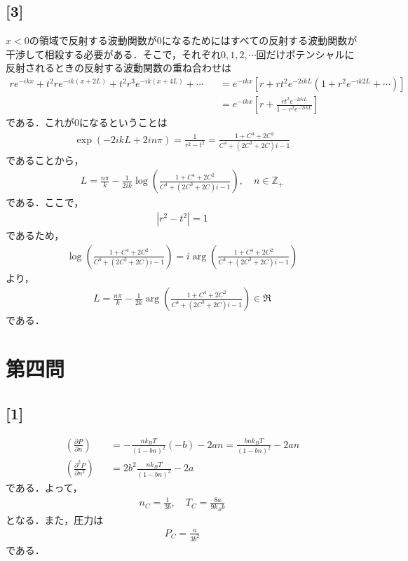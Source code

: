 \documentclass[12pt,dvipdfmx]{jsarticle}
\begin{document}
\subsection*{\large{[3]}}
$x<0$の領域で反射する波動関数が$0$になるためにはすべての反射する波動関数が干渉して相殺する必要がある．そこで，それぞれ$0,1,2,\cdots$回だけポテンシャルに反射されるときの反射する波動関数の重ね合わせは
\begin{eqnarray}
  re^{-ikx} + t^2re^{-ik(x+2L)} + t^2r^3e^{-ik(x+4L)} + \cdots &&= e^{-ikx}\left[ r+ rt^2 e^{-2ikL}\left( 1 + r^2 e^{-ik2L} + \cdots \right) \right]\\
  &&=e^{-ikx}\left[ r+\frac{rt^2e^{-2ikL}}{1-r^2e^{-2ikL}} \right]
\end{eqnarray}
である．これが$0$になるということは
\begin{eqnarray}
  \exp\left( -2ikL+2in\pi \right) = \frac{1}{r^2-t^2} = \frac{1+C^4+2C^2}{C^4+(2C^3+2C)i-1}
\end{eqnarray}
であることから，
\begin{eqnarray}
  L = \frac{n\pi}{k} -\frac{1}{2ik}\log\left( \frac{1+C^4+2C^2}{C^4+(2C^3+2C)i-1} \right), \quad n\in\mathbb{Z}_+
\end{eqnarray}
である．ここで，
\begin{eqnarray}
  |r^2-t^2|=1
\end{eqnarray}
であるため，
\begin{eqnarray}
  \log\left( \frac{1+C^4+2C^2}{C^4+(2C^3+2C)i-1} \right) = i\arg \left( \frac{1+C^4+2C^2}{C^4+(2C^3+2C)i-1} \right) 
\end{eqnarray}
より，
\begin{eqnarray}
  L = \frac{n\pi}{k} -\frac{1}{2k}\arg \left( \frac{1+C^4+2C^2}{C^4+(2C^3+2C)i-1} \right) \in \Re
\end{eqnarray}
である．

\newpage
\section*{\Large{第四問}}
\subsection*{\large{[1]}}
\begin{eqnarray}
  \left( \frac{\partial P}{\partial n} \right)&&= -\frac{nk_BT}{(1-bn)^2}(-b)-2an = \frac{bnk_BT}{(1-bn)^2}-2an\\
  \left( \frac{\partial^2 P}{\partial n^2} \right)&&= 2b^2\frac{nk_BT}{(1-bn)^3}-2a
\end{eqnarray}
である．よって，
\begin{eqnarray}
  n_C =\frac{1}{3b}, \quad T_C = \frac{8a}{9k_B b}
\end{eqnarray}
となる．また，圧力は
\begin{eqnarray}
  P_C = \frac{a}{3b^2}
\end{eqnarray}
である．
\end{document}

